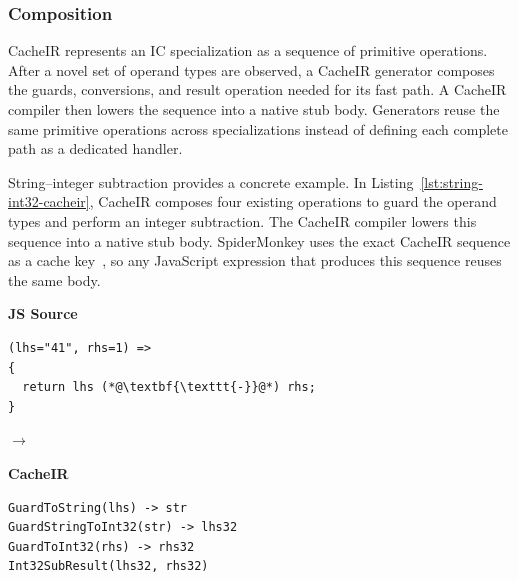 \documentclass[sigplan,screen,review,anonymous]{acmart}
\begin{document}
\subsubsection{Composition}

CacheIR represents an IC specialization as a sequence of primitive operations. After a novel set of operand types are observed, a CacheIR generator composes the guards, conversions, and result operation needed for its fast path. A CacheIR compiler then lowers the sequence into a native stub body. Generators reuse the same primitive operations across specializations instead of defining each complete path as a dedicated handler.

String--integer subtraction provides a concrete example. In Listing~\ref{lst:string-int32-cacheir}, CacheIR composes four existing operations to guard the operand types and perform an integer subtraction. The CacheIR compiler lowers this sequence into a native stub body.
SpiderMonkey uses the exact CacheIR sequence as a cache key~\cite{demooij2023cacheir}, so any JavaScript expression that produces this sequence reuses the same body.

\begin{listing}[t!]
  \centering
  \begin{minipage}{\linewidth}
  \begin{minipage}[t]{0.30\linewidth}
    \centering
    {\footnotesize\bfseries JS Source\par}
    \smallskip
\begin{lstlisting}
(lhs="41", rhs=1) =>
{
  return lhs (*@\textbf{\texttt{-}}@*) rhs;
}
\end{lstlisting}
  \end{minipage}\hfill
  \begin{minipage}[t]{0.05\linewidth}
    \centering
    \vspace{1.7\baselineskip}$\rightarrow$
  \end{minipage}\hfill
  \begin{minipage}[t]{0.61\linewidth}
    \centering
    {\footnotesize\bfseries CacheIR\par}
    \smallskip
\begin{lstlisting}
GuardToString(lhs) -> str
GuardStringToInt32(str) -> lhs32
GuardToInt32(rhs) -> rhs32
Int32SubResult(lhs32, rhs32)
\end{lstlisting}
  \end{minipage}
  \end{minipage}
  \caption{Specialized CacheIR stub for string--integer subtraction.}
  \label{lst:string-int32-cacheir}
\end{listing}
\end{document}
